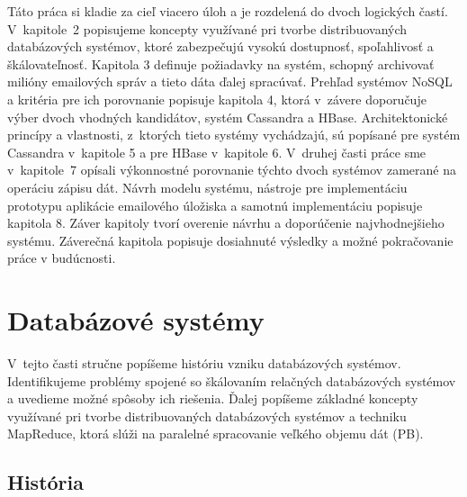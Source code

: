 \documentclass[11pt,twoside,a4paper]{book}
\begin{document}
Táto práca si kladie za cieľ viacero úloh a je rozdelená do dvoch logických častí. V~kapitole~2 popisujeme koncepty využívané pri tvorbe distribuovaných databázových systémov, ktoré zabezpečujú vysokú dostupnosť, spoľahlivosť a škálovateľnosť. Kapitola 3 definuje požiadavky na systém, schopný archivovať milióny emailových správ a tieto dáta ďalej spracúvať. Prehľad systémov NoSQL a kritéria pre ich porovnanie popisuje kapitola 4, ktorá v~závere doporučuje výber dvoch vhodných kandidátov, systém Cassandra a HBase. Architektonické princípy a vlastnosti, z~ktorých tieto systémy vychádzajú, sú popísané pre systém Cassandra v~kapitole 5 a pre HBase v~kapitole 6.
V~druhej časti práce sme v~kapitole~7 opísali výkonnostné porovnanie týchto dvoch systémov zamerané na operáciu zápisu dát. Návrh modelu systému,
nástroje pre implementáciu prototypu aplikácie emailového úložiska a samotnú implementáciu popisuje kapitola 8. Záver kapitoly tvorí overenie návrhu a doporúčenie najvhodnejšieho systému. Záverečná kapitola popisuje dosiahnuté výsledky a možné pokračovanie práce v budúcnosti.







\chapter{Databázové systémy}

V~tejto časti stručne popíšeme históriu vzniku databázových systémov. Identifikujeme problémy spojené so škálovaním relačných databázových systémov a uvedieme možné spôsoby ich riešenia. Ďalej popíšeme základné koncepty využívané pri tvorbe distribuovaných databázových systémov a techniku MapReduce, ktorá slúži na paralelné spracovanie veľkého objemu dát (PB).

\section{História}
\end{document}
